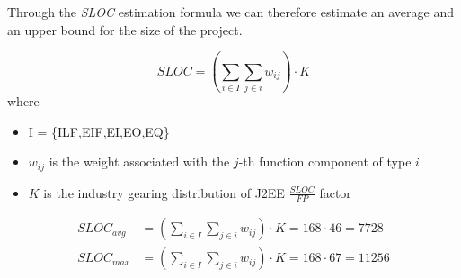 Through the \emph{SLOC} estimation formula we can therefore estimate an average and an upper bound for the size of the project. 

 $$SLOC = (\sum_{i \in I} \sum_{j \in i} w_{ij}) \cdot K$$
where 
\begin{itemize}
	\item I = \{ILF,EIF,EI,EO,EQ\}
	\item $w_{ij}$ is the weight associated with the $j$-th function component of type $i$
	\item $K$ is the industry gearing distribution of J2EE $\frac{SLOC}{FP}$ factor
\end{itemize} 

 \begin{align*}
 SLOC_{avg} &= (\sum_{i \in I} \sum_{j \in i} w_{ij}) \cdot K = 168 \cdot 46 = 7728 \\ 
  SLOC_{max} &= (\sum_{i \in I} \sum_{j \in i} w_{ij}) \cdot K = 168 \cdot 67 =11256
  \end{align*}

